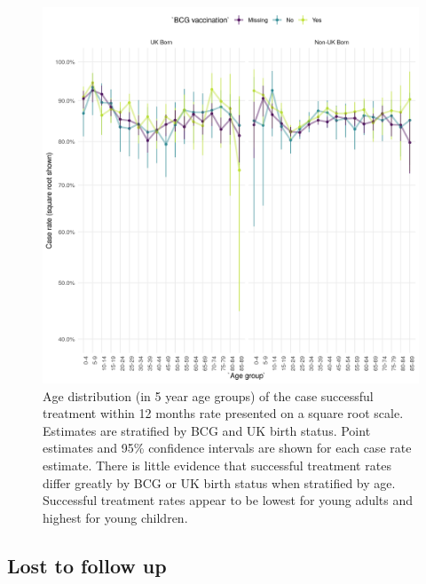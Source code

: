 \documentclass[11pt,twoside]{bristolthesis}
\begin{document}
  \begin{figure}
  
  {\centering \includegraphics[width=0.8\linewidth]{chapters/tb-epi-england/figures/plot-suc-treat-age-dist} 
  
  }
  
  \caption{Age distribution (in 5 year age groups) of the case successful treatment within 12 months rate presented on a square root scale. Estimates are stratified by BCG and UK birth status. Point estimates and 95\%  confidence intervals are shown for each case rate estimate. There is little evidence that successful treatment rates differ greatly by BCG or UK birth status when stratified by age. Successful treatment rates appear to be lowest for young adults and highest for young children.}\label{fig:plot-succ-treat-age-dist}
  \end{figure}
  \hypertarget{lost-to-follow-up}{%
  \subsection{Lost to follow up}\label{lost-to-follow-up}}
  
\end{document}
